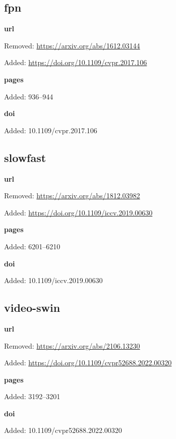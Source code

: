 \subsection*{fpn}
\noindent\textbf{url}\par
{\color{AuditRed}Removed: \url{https://arxiv.org/abs/1612.03144}\par}
{\color{AuditGreen}Added: \url{https://doi.org/10.1109/cvpr.2017.106}\par}
\noindent\textbf{pages}\par
{\color{AuditGreen}Added: 936–944\par}
\noindent\textbf{doi}\par
{\color{AuditGreen}Added: 10.1109/cvpr.2017.106\par}
\medskip

\subsection*{slowfast}
\noindent\textbf{url}\par
{\color{AuditRed}Removed: \url{https://arxiv.org/abs/1812.03982}\par}
{\color{AuditGreen}Added: \url{https://doi.org/10.1109/iccv.2019.00630}\par}
\noindent\textbf{pages}\par
{\color{AuditGreen}Added: 6201–6210\par}
\noindent\textbf{doi}\par
{\color{AuditGreen}Added: 10.1109/iccv.2019.00630\par}
\medskip

\subsection*{video-swin}
\noindent\textbf{url}\par
{\color{AuditRed}Removed: \url{https://arxiv.org/abs/2106.13230}\par}
{\color{AuditGreen}Added: \url{https://doi.org/10.1109/cvpr52688.2022.00320}\par}
\noindent\textbf{pages}\par
{\color{AuditGreen}Added: 3192–3201\par}
\noindent\textbf{doi}\par
{\color{AuditGreen}Added: 10.1109/cvpr52688.2022.00320\par}
\medskip

